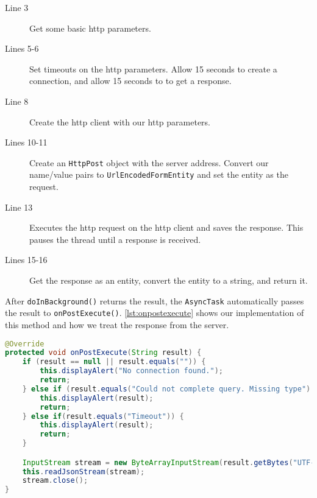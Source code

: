 \begin{description}
\item[Line 3] Get some basic \ac{http} parameters.
\item[Lines 5-6] Set timeouts on the \ac{http} parameters. Allow 15 seconds to create a connection, and allow 15 seconds to to get a response.
\item[Line 8] Create the \ac{http} client with our \ac{http} parameters.
\item[Lines 10-11] Create an \lstinline|HttpPost| object with the server address. Convert our name/value pairs to \lstinline|UrlEncodedFormEntity| and set the entity as the request.
\item[Line 13] Executes the \ac{http} request on the \ac{http} client and saves the response. This pauses the thread until a response is received.
\item[Lines 15-16] Get the response as an entity, convert the entity to a string, and return it.
\end{description}
After \lstinline|doInBackground()| returns the result, the \lstinline|AsyncTask| automatically passes the result to \lstinline|onPostExecute()|. \autoref{lst:onpostexecute} shows our implementation of this method and how we treat the response from the server.

\begin{lstlisting}[language=java, label=lst:onpostexecute, caption={The async method \lstinline|onPostExecute()|}]
@Override
protected void onPostExecute(String result) {
    if (result == null || result.equals("")) {
        this.displayAlert("No connection found.");
        return;
    } else if (result.equals("Could not complete query. Missing type") || result.equals("Missing request code!")) {
        this.displayAlert(result);
        return;
    } else if(result.equals("Timeout")) {
        this.displayAlert(result);
        return;
    }

    InputStream stream = new ByteArrayInputStream(result.getBytes("UTF-8"));
    this.readJsonStream(stream);
    stream.close();
}
\end{lstlisting}

